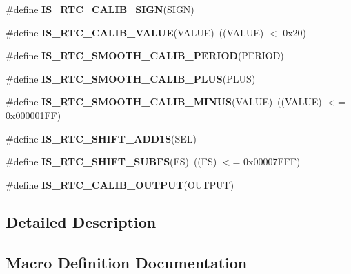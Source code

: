 \begin{DoxyCompactItemize}
\item 
\#define {\bfseries I\+S\+\_\+\+R\+T\+C\+\_\+\+C\+A\+L\+I\+B\+\_\+\+S\+I\+GN}(S\+I\+GN)
\item 
\#define {\bfseries I\+S\+\_\+\+R\+T\+C\+\_\+\+C\+A\+L\+I\+B\+\_\+\+V\+A\+L\+UE}(V\+A\+L\+UE)~((V\+A\+L\+UE) $<$ 0x20)\hypertarget{group___r_t_c_ex___i_s___r_t_c___definitions_gafa25555b5daedee7b1fcba41afa6ed8b}{}\label{group___r_t_c_ex___i_s___r_t_c___definitions_gafa25555b5daedee7b1fcba41afa6ed8b}

\item 
\#define {\bfseries I\+S\+\_\+\+R\+T\+C\+\_\+\+S\+M\+O\+O\+T\+H\+\_\+\+C\+A\+L\+I\+B\+\_\+\+P\+E\+R\+I\+OD}(P\+E\+R\+I\+OD)
\item 
\#define {\bfseries I\+S\+\_\+\+R\+T\+C\+\_\+\+S\+M\+O\+O\+T\+H\+\_\+\+C\+A\+L\+I\+B\+\_\+\+P\+L\+US}(P\+L\+US)
\item 
\#define {\bfseries I\+S\+\_\+\+R\+T\+C\+\_\+\+S\+M\+O\+O\+T\+H\+\_\+\+C\+A\+L\+I\+B\+\_\+\+M\+I\+N\+US}(V\+A\+L\+UE)~((V\+A\+L\+UE) $<$= 0x000001\+F\+F)\hypertarget{group___r_t_c_ex___i_s___r_t_c___definitions_ga257f8bd6835bee480a80416bf086e200}{}\label{group___r_t_c_ex___i_s___r_t_c___definitions_ga257f8bd6835bee480a80416bf086e200}

\item 
\#define {\bfseries I\+S\+\_\+\+R\+T\+C\+\_\+\+S\+H\+I\+F\+T\+\_\+\+A\+D\+D1S}(S\+EL)
\item 
\#define {\bfseries I\+S\+\_\+\+R\+T\+C\+\_\+\+S\+H\+I\+F\+T\+\_\+\+S\+U\+B\+FS}(FS)~((FS) $<$= 0x00007\+F\+F\+F)\hypertarget{group___r_t_c_ex___i_s___r_t_c___definitions_ga8ad118d512f7dc9ce3d4b6669fd3f4b4}{}\label{group___r_t_c_ex___i_s___r_t_c___definitions_ga8ad118d512f7dc9ce3d4b6669fd3f4b4}

\item 
\#define {\bfseries I\+S\+\_\+\+R\+T\+C\+\_\+\+C\+A\+L\+I\+B\+\_\+\+O\+U\+T\+P\+UT}(O\+U\+T\+P\+UT)
\end{DoxyCompactItemize}


\subsection{Detailed Description}


\subsection{Macro Definition Documentation}
